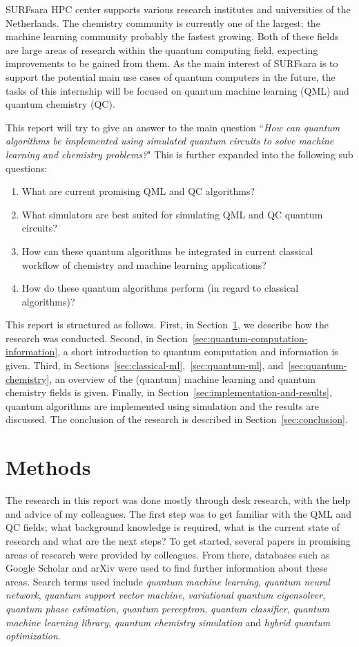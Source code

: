 \documentclass[a4paper,10pt]{article}
\begin{document}
SURFsara HPC center supports various research institutes and universities of the Netherlands.
The chemistry community is currently one of the largest; the machine learning community probably the fastest growing.
Both of these fields are large areas of research within the quantum computing field, expecting improvements to be gained from them.
As the main interest of SURFsara is to support the potential main use cases of quantum computers in the future, the tasks of this internship will be focused on quantum machine learning (QML) and quantum chemistry (QC).

This report will try to give an answer to the main question ``\emph{How can quantum algorithms be implemented using simulated quantum circuits to solve machine learning and chemistry problems?}"
This is further expanded into the following sub questions:
\begin{enumerate}
	\item What are current promising QML and QC algorithms?
	\item What simulators are best suited for simulating QML and QC quantum circuits?
	\item How can these quantum algorithms be integrated in current classical workflow of chemistry and machine learning applications?
	\item How do these quantum algorithms perform (in regard to classical algorithms)?
\end{enumerate}

This report is structured as follows. First, in Section~\ref{sec:methods}, we describe how the research was conducted.
Second, in Section~\ref{sec:quantum-computation-information}, a short introduction to quantum computation and information is given.
Third, in Sections~\ref{sec:classical-ml},~\ref{sec:quantum-ml}, and~\ref{sec:quantum-chemistry}, an overview of the (quantum) machine learning and quantum chemistry fields is given.
Finally, in Section~\ref{sec:implementation-and-results}, quantum algorithms are implemented using simulation and the results are discussed.
The conclusion of the research is described in Section~\ref{sec:conclusion}.

\section{Methods} \label{sec:methods}
The research in this report was done mostly through desk research, with the help and advice of my colleagues.
The first step was to get familiar with the QML and QC fields; what background knowledge is required, what is the current state of research and what are the next steps?
To get started, several papers in promising areas of research were provided by colleagues. 
From there, databases such as Google Scholar and arXiv were used to find further information about these areas.
Search terms used include \emph{quantum machine learning}, \emph{quantum neural network}, \emph{quantum support vector machine}, \emph{variational quantum eigensolver}, \emph{quantum phase estimation}, \emph{quantum perceptron}, \emph{quantum classifier}, \emph{quantum machine learning library}, \emph{quantum chemistry simulation} and \emph{hybrid quantum optimization}.
\end{document}
